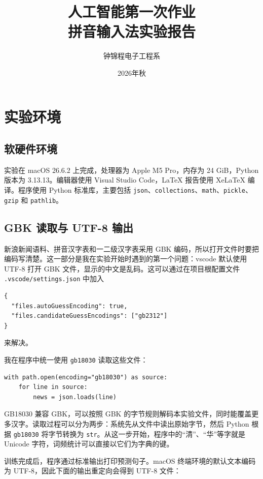 \documentclass[11pt,a4paper]{ctexart}
\title{人工智能第一次作业\\拼音输入法实验报告}
\author{钟锦程\quad 2026210748\quad 电子工程系}
\date{2026年秋}
\begin{document}
\pagestyle{plain}

\maketitle
\setcounter{tocdepth}{1}
\tableofcontents
\newpage

\section{实验环境}

\subsection{软硬件环境}

实验在 macOS 26.6.2 上完成，处理器为 Apple M5 Pro，内存为 24 GiB，Python 版本为 3.13.13。编辑器使用 Visual Studio Code，LaTeX 报告使用 XeLaTeX 编译。程序使用 Python 标准库，主要包括 \texttt{json}、\texttt{collections}、\texttt{math}、\texttt{pickle}、\texttt{gzip} 和 \texttt{pathlib}。

\subsection{GBK 读取与 UTF-8 输出}

新浪新闻语料、拼音汉字表和一二级汉字表采用 GBK 编码，所以打开文件时要把编码写清楚。这一部分是我在实验开始时遇到的第一个问题：vscode 默认使用 UTF-8 打开 GBK 文件，显示的中文是乱码。这可以通过在项目根配置文件 \texttt{.vscode/settings.json} 中加入
\begin{verbatim}
{
  "files.autoGuessEncoding": true,
  "files.candidateGuessEncodings": ["gb2312"]
}
\end{verbatim}
来解决。

我在程序中统一使用 \texttt{gb18030} 读取这些文件：

\begin{verbatim}
with path.open(encoding="gb18030") as source:
    for line in source:
        news = json.loads(line)
\end{verbatim}

GB18030 兼容 GBK，可以按照 GBK 的字节规则解码本实验文件，同时能覆盖更多汉字。读取过程可以分为两步：系统先从文件中读出原始字节，然后 Python 根据 \texttt{gb18030} 将字节转换为 \texttt{str}。从这一步开始，程序中的“清”、“华”等字就是 Unicode 字符，词频统计可以直接以它们为字典的键。

训练完成后，程序通过标准输出打印预测句子。macOS 终端环境的默认文本编码为 UTF-8，因此下面的输出重定向会得到 UTF-8 文件：
\end{document}
